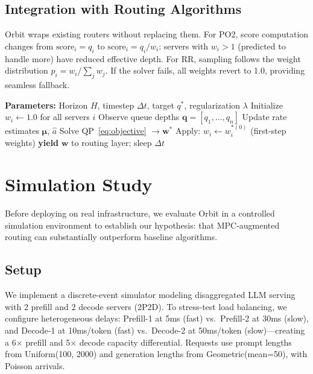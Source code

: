 \documentclass[runningheads]{llncs}
\begin{document}
\subsection{Integration with Routing Algorithms}
\label{sec:integration}

Orbit wraps existing routers without replacing them. For PO2, score computation changes from $\text{score}_i = q_i$ to $\text{score}_i = q_i / w_i$: servers with $w_i > 1$ (predicted to handle more) have reduced effective depth. For RR, sampling follows the weight distribution $p_i = w_i / \sum_j w_j$. If the solver fails, all weights revert to 1.0, providing seamless fallback.

\begin{algorithm}[t]
\caption{Orbit MPC Controller}
\label{alg:mpc}
\begin{algorithmic}[1]
\STATE \textbf{Parameters:} Horizon $H$, timestep $\Delta t$, target $q^*$, regularization $\lambda$
\STATE Initialize $w_i \leftarrow 1.0$ for all servers $i$
\LOOP
    \STATE Observe queue depths $\mathbf{q} = [q_1, \ldots, q_n]$
    \STATE Update rate estimates $\boldsymbol{\mu}$, $\hat{a}$
    \STATE Solve QP~\eqref{eq:objective} $\rightarrow \mathbf{w}^*$
    \STATE Apply: $w_i \leftarrow w_i^{*(0)}$ \quad (first-step weights)
    \STATE \textbf{yield} $\mathbf{w}$ to routing layer; sleep $\Delta t$
\ENDLOOP
\end{algorithmic}
\end{algorithm}

\section{Simulation Study}
\label{sec:simulation}

Before deploying on real infrastructure, we evaluate Orbit in a controlled simulation environment to establish our hypothesis: that MPC-augmented routing can substantially outperform baseline algorithms.

\subsection{Setup}

We implement a discrete-event simulator modeling disaggregated LLM serving with 2 prefill and 2 decode servers (2P2D). To stress-test load balancing, we configure heterogeneous delays: Prefill-1 at 5ms (fast) vs.\ Prefill-2 at 30ms (slow), and Decode-1 at 10ms/token (fast) vs.\ Decode-2 at 50ms/token (slow)---creating a 6$\times$ prefill and 5$\times$ decode capacity differential. Requests use prompt lengths from Uniform(100, 2000) and generation lengths from Geometric(mean=50), with Poisson arrivals.
\end{document}

